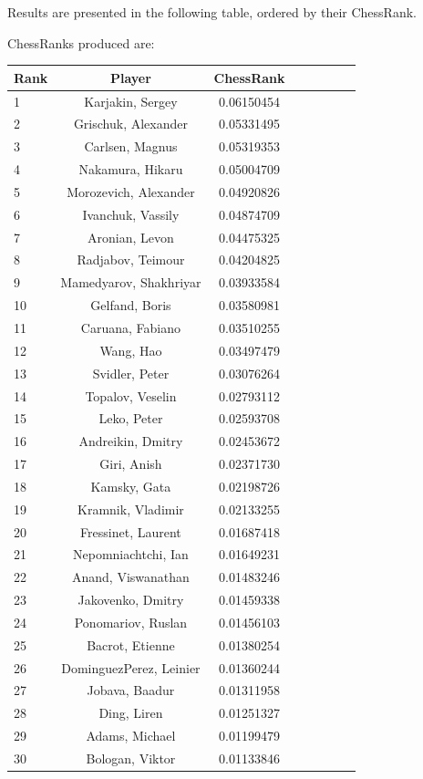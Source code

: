 \documentclass[pdftex,11pt,a4paper]{report}
\begin{document}
Results are presented in the following table, ordered by their ChessRank.

ChessRanks produced are:

\begin{singlespace}
\begin{tabular}{l*{6}{c}r}
Rank & Player & ChessRank \\ 
\hline
1 & Karjakin, Sergey & 0.06150454 \\
2 & Grischuk, Alexander & 0.05331495 \\
3 & Carlsen, Magnus & 0.05319353 \\
4 & Nakamura, Hikaru & 0.05004709 \\
5 & Morozevich, Alexander & 0.04920826 \\
6 & Ivanchuk, Vassily & 0.04874709 \\
7 & Aronian, Levon & 0.04475325 \\
8 & Radjabov, Teimour & 0.04204825 \\
9 & Mamedyarov, Shakhriyar & 0.03933584 \\
10 & Gelfand, Boris & 0.03580981 \\
11 & Caruana, Fabiano & 0.03510255 \\
12 & Wang, Hao & 0.03497479 \\
13 & Svidler, Peter & 0.03076264 \\
14 & Topalov, Veselin & 0.02793112 \\
15 & Leko, Peter & 0.02593708 \\
16 & Andreikin, Dmitry & 0.02453672 \\
17 & Giri, Anish & 0.02371730 \\
18 & Kamsky, Gata & 0.02198726 \\
19 & Kramnik, Vladimir & 0.02133255 \\
20 & Fressinet, Laurent & 0.01687418 \\
21 & Nepomniachtchi, Ian & 0.01649231 \\
22 & Anand, Viswanathan & 0.01483246 \\
23 & Jakovenko, Dmitry & 0.01459338 \\
24 & Ponomariov, Ruslan & 0.01456103 \\
25 & Bacrot, Etienne & 0.01380254 \\
26 & DominguezPerez, Leinier & 0.01360244 \\
27 & Jobava, Baadur & 0.01311958 \\
28 & Ding, Liren & 0.01251327 \\
29 & Adams, Michael & 0.01199479 \\
30 & Bologan, Viktor & 0.01133846 \\
\end{tabular}
\end{singlespace}
\end{document}
